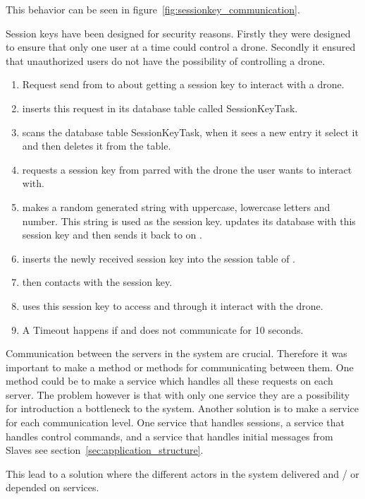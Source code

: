 This behavior can be seen in figure~\ref{fig:sessionkey_communication}. 

Session keys have been designed for security reasons.
Firstly they were designed to ensure that only one user at a time could control a drone.
Secondly it ensured that unauthorized users do not have the possibility of controlling a drone.

\begin{enumerate}
	\item Request send from  to  about getting a session key to interact with a drone.
	\item {} inserts this request in its database table called SessionKeyTask.
	\item {} scans the database table SessionKeyTask, when it sees a new entry it select it and then deletes it from the table.
	\item {} requests a session key from  parred with the drone the user wants to interact with.
	\item {} makes a random generated string with uppercase, lowercase letters and number. This string is used as the session key.  updates its database with this session key and then sends it back to  on .
	\item {} inserts the newly received session key into the session table of .
	\item {} then contacts  with the session key.
	\item {} uses this session key to access  and through it interact with the drone.
	\item A Timeout happens if  and  does not communicate for 10 seconds.
\end{enumerate}

Communication between the servers in the system are crucial. 
Therefore it was important to make a method or methods for communicating between them. 
One method could be to make a service which handles all these requests on each server. 
The problem however is that with only one service they are a possibility for introduction a bottleneck to the system.
Another solution is to make a service for each communication level. One service that handles sessions, a service that handles control commands, and a service that handles initial messages from Slaves see section~\ref{sec:application_structure}.

This lead to a solution where the different actors in the system delivered and / or depended on services.

